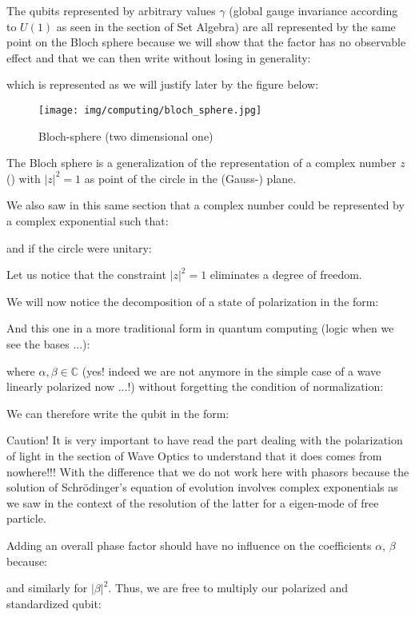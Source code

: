 	The qubits represented by arbitrary values $\gamma$ (global gauge invariance according to $U(1)$ as seen in the section of Set Algebra) are all represented by the same point on the Bloch sphere because we will show that the factor has no observable effect and that we can then write without losing in generality:
	
	
	which is represented as we will justify later by the figure below:
	\begin{figure}[H]
		\centering
		\texttt{[image: img/computing/bloch\_sphere.jpg]}
		\caption{Bloch-sphere (two dimensional one)}	
	\end{figure}
	The Bloch sphere is a generalization of the representation of a complex number $z$ () with $|z|^2=1$ as point of the circle in the (Gauss-) plane.

	We also saw in this same section that a complex number could be represented by a complex exponential such that:
	
	and if the circle were unitary:
	
	Let us notice that the constraint $|z|^2=1$ eliminates a degree of freedom.

	We will now notice the decomposition of a state of polarization in the form:
	
	And this one in a more traditional form in quantum computing (logic when we see the bases ...):
	
	where $\alpha,\beta\in\mathbb{C}$ (yes! indeed we are not anymore in the simple case of a wave linearly polarized now ...!) without forgetting the condition of normalization:
	
	We can therefore write the qubit in the form:
	
	\begin{tcolorbox}[title=Remark,colframe=black,arc=10pt]
	Caution! It is very important to have read the part dealing with the polarization of light in the section of Wave Optics to understand that it does comes from nowhere!!! With the difference that we do not work here with phasors because the solution of Schrödinger's equation of evolution involves complex exponentials as we saw in the context of the resolution of the latter for a eigen-mode of free particle.
	\end{tcolorbox}
	Adding an overall phase factor should have no influence on the coefficients $\alpha$, $\beta$ because:
	
	and similarly for $|\beta|^2$. Thus, we are free to multiply our polarized and standardized qubit:
	
